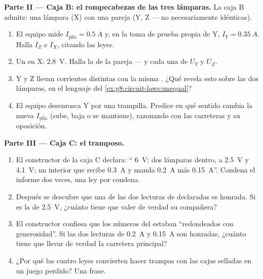 \begin{problem}
\medskip\noindent\textbf{Parte II --- Caja B: el rompecabezas de las
tres lámparas.}
La caja B admite: una lámpara (X)  con una pareja  (Y, Z --- no necesariamente idénticas).
\begin{enumerate}[resume]
  \item El equipo mide $I_{\text{pila}} = \qty{0.5}{A}$ y, en
        la toma de prueba propia de Y, $I_Y = \qty{0.35}{A}$. Halla
        $I_Z$ e $I_X$, citando las leyes.
  \item Un  en X: \qty{2.8}{V}. Halla la
         de la pareja  --- y cada una de $U_Y$
        y $U_Z$.
  \item Y y Z llevan corrientes distintas con la misma
        . ¿Qué revela esto sobre las dos lámparas, en el
        lenguaje del \cref{ex:g8:circuit-laws:unequal}?
  \item El equipo desenrosca Y por una trampilla. Predice en qué
        sentido cambia la nueva $I_{\text{pila}}$ (sube, baja o se
        mantiene), razonando con las carreteras y su oposición.
\end{enumerate}

\medskip\noindent\textbf{Parte III --- Caja C: el tramposo.}
\begin{enumerate}[resume]
  \item El constructor de la caja C declara: ``
        \qty{6}{V}; dos lámparas  dentro, a \qty{2.5}{V} y
        \qty{4.1}{V}; un  interior que recibe \qty{0.3}{A}
        y manda \qty{0.2}{A} más \qty{0.15}{A}''. Condena el informe
        dos veces, una ley por condena.
  \item Después se descubre que una de las dos lecturas de
         declaradas es honrada. Si es la de
        \qty{2.5}{V}, ¿cuánto tiene que valer de verdad su
        compañera?
  \item El constructor confiesa que los números del 
        estaban ``redondeados con generosidad''. Si las dos lecturas
        de  \qty{0.2}{A} y \qty{0.15}{A} son honradas,
        ¿cuánto tiene que llevar de verdad la carretera principal?
  \item ¿Por qué las cuatro leyes convierten hacer trampas con las
        cajas selladas en un juego perdido? Una frase.
\end{enumerate}


\end{problem}
